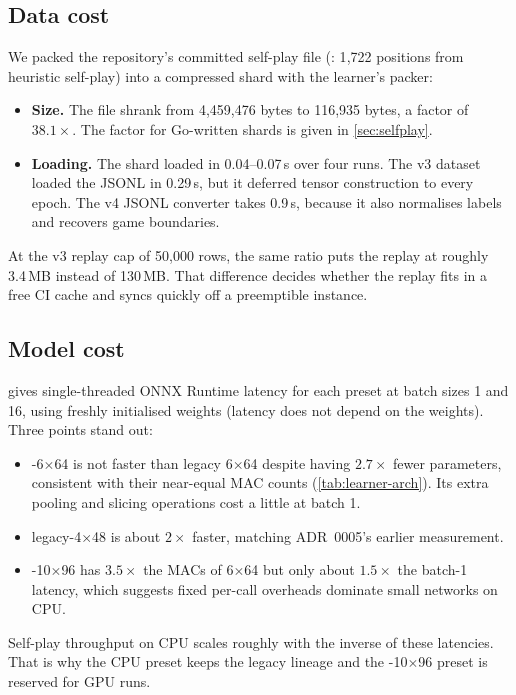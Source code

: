 \subsection{Data cost}\label{sec:eval-data}

We packed the repository's committed self-play file (:
1{,}722 positions from heuristic self-play) into a compressed shard with the learner's
packer:
\begin{itemize}
  \item \textbf{Size.} The file shrank from 4{,}459{,}476 bytes to 116{,}935 bytes, a
        factor of $38.1\times$. The factor for Go-written shards is given in
        \cref{sec:selfplay}.
  \item \textbf{Loading.} The shard loaded in 0.04--0.07\,s over four runs. The v3 dataset loaded the JSONL in
        0.29\,s, but it deferred tensor construction to every epoch. The v4 JSONL
        converter takes 0.9\,s, because it also normalises labels and recovers game
        boundaries.
\end{itemize}
At the v3 replay cap of 50{,}000 rows, the same ratio puts the replay at roughly 3.4\,MB
instead of 130\,MB. That difference decides whether the replay fits in a free CI cache and
syncs quickly off a preemptible instance.

\subsection{Model cost}\label{sec:eval-model}

 gives single-threaded ONNX Runtime latency for each preset at
batch sizes 1 and 16, using freshly initialised weights (latency does not depend on the
weights). Three points stand out:
\begin{itemize}
  \item {}-6$\times$64 is not faster than legacy 6$\times$64 despite having
        $2.7\times$ fewer parameters, consistent with their near-equal MAC counts
        (\cref{tab:learner-arch}). Its extra pooling and slicing operations cost a little
        at batch 1.
  \item legacy-4$\times$48 is about $2\times$ faster, matching ADR~0005's earlier
        measurement.
  \item {}-10$\times$96 has $3.5\times$ the MACs of 6$\times$64 but only about
        $1.5\times$ the batch-1 latency, which suggests fixed per-call overheads dominate
        small networks on CPU.
\end{itemize}
Self-play throughput on CPU scales roughly with the inverse of these latencies. That is
why the CPU preset keeps the legacy lineage and the -10$\times$96 preset is
reserved for GPU runs.

